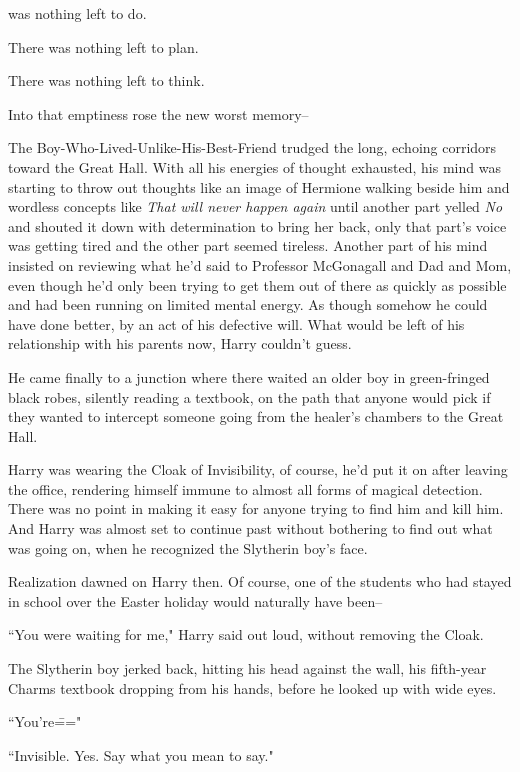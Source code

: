 
 was nothing left to do.

\hplettrineextrapara
There was nothing left to plan.

There was nothing left to think.

Into that emptiness rose the new worst memory\---

The Boy-Who-Lived-Unlike-His-Best-Friend trudged the long, echoing corridors toward the Great Hall. With all his energies of thought exhausted, his mind was starting to throw out thoughts like an image of Hermione walking beside him and wordless concepts like \emph{That will never happen again} until another part yelled \emph{No} and shouted it down with determination to bring her back, only that part's voice was getting tired and the other part seemed tireless. Another part of his mind insisted on reviewing what he'd said to Professor McGonagall and Dad and Mom, even though he'd only been trying to get them out of there as quickly as possible and had been running on limited mental energy. As though somehow he could have done better, by an act of his defective will. What would be left of his relationship with his parents now, Harry couldn't guess.

He came finally to a junction where there waited an older boy in green-fringed black robes, silently reading a textbook, on the path that anyone would pick if they wanted to intercept someone going from the healer's chambers to the Great Hall.

Harry was wearing the Cloak of Invisibility, of course, he'd put it on after leaving the office, rendering himself immune to almost all forms of magical detection. There was no point in making it easy for anyone trying to find him and kill him. And Harry was almost set to continue past without bothering to find out what was going on, when he recognized the Slytherin boy's face.

Realization dawned on Harry then. Of course, one of the students who had stayed in school over the Easter holiday would naturally have been\---

``You were waiting for me," Harry said out loud, without removing the Cloak.

The Slytherin boy jerked back, hitting his head against the wall, his fifth-year Charms textbook dropping from his hands, before he looked up with wide eyes.

``You're\==="

``Invisible. Yes. Say what you mean to say."

